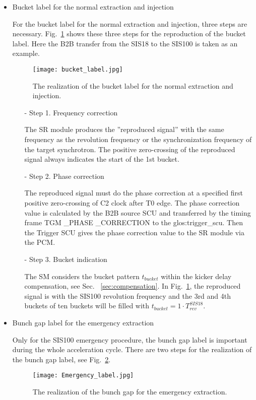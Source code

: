 \begin{itemize}
\item Bucket label for the normal extraction and injection

For the bucket label for the normal extraction and injection, three steps are necessary. Fig.~\ref{bucket_label} shows these three steps for the reproduction of the bucket label. Here the B2B transfer from the SIS18 to the SIS100 is taken as an example.
\begin{figure}[!htb]
   \centering   
   \texttt{[image: bucket\_label.jpg]}
   \caption{The realization of the bucket label for the normal extraction and injection.}
   \label{bucket_label}
\end{figure}  
\begin{itemize}
\item[-] Step 1. Frequency correction

The \gls{SR} module produces the ''reproduced signal'' with the same frequency as the revolution frequency or the synchronization frequency of the target synchrotron. The positive zero-crossing of the reproduced signal always indicates the start of the 1st bucket.
\item[-] Step 2. Phase correction

The reproduced signal must do the phase correction at a specified first positive zero-crossing of C2 clock after T0 edge. The phase correction value is calculated by the B2B source SCU and transferred by the timing frame TGM \_PHASE \_CORRECTION to the \gls{glos:trigger_scu}. Then the Trigger SCU gives the phase correction value to the SR module via the PCM.

\item[-] Step 3. Bucket indication

The SM considers the bucket pattern $t_{\mathit{bucket}}$ within the kicker delay compensation, see Sec. ~\ref{sec:compensation}. In Fig.~\ref{bucket_label}, the reproduced signal is with the SIS100 revolution frequency and the 3rd and 4th buckets of ten buckets will be filled with $t_{\mathit{bucket}}=1\cdot T_{\mathit{rev}}^{\mathit{SIS18}}$. 
\end{itemize}

\item Bunch gap label for the emergency extraction

Only for the SIS100 emergency procedure, the bunch gap label is important during the whole acceleration cycle. There are two steps for the realization of the bunch gap label, see Fig.~\ref{Emergency_label}.
\begin{figure}[!htb]
   \centering   
   \texttt{[image: Emergency\_label.jpg]}
   \caption{The realization of the bunch gap for the emergency extraction.}
   \label{Emergency_label}
\end{figure} 


\end{itemize}
